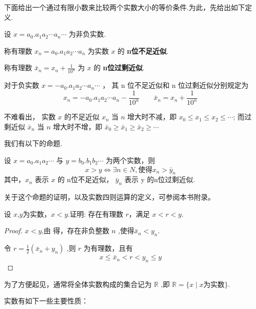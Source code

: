 下面给出一个通过有限小数来比较两个实数大小的等价条件.为此，先给出如下定义.

\begin{definition}[实数的近似]
    设 $x=a_0.a_1 a_2 \cdots a_n \cdots$ 为非负实数.

    \textbullet 称有理数 $x_n=a_0.a_1 a_2 \cdots a_n$ 为实数 $x$ 的 \textbf{n位不足近似}.

    \textbullet 称有理数 $\bar x_n=x_n + \frac{1}{10^n}$ 为 $x$ 的 \textbf{n位过剩近似}.

    对于负实数 $x=-a_0.a_1 a_2 \cdots a_n \cdots$ ， 其 n 位不足近似和 n 位过剩近似分别规定为
    \[
      x_n = -a_0.a_1 a_2 \cdots a_n - \frac{1}{10^n} \qquad \bar x_n = x_n +\frac{1}{10^n}
    \]
\end{definition}

\begin{annotation}
    不难看出， 实数 $x$ 的不足近似 $x_n$ 当 $n$ 增大时不减，即 $x_0 \le x_1 \le x_2 \le \cdots$; 而过剩近似 $\bar x_n $ 当 $n$ 增大时不增，即 $\bar x_0 \ge \bar x_1 \ge  \bar x_2 \ge \cdots$
\end{annotation}

我们有以下的命题.

\begin{proposition}[近似等价比大小]\label{pro:about}
    设 $x=a_0.a_1a_2\cdots$ 与 $y=b_0.b_1b_2\cdots$ 为两个实数，则
    \[
    x>y \iff \exists n\in N , \mbox{使得} x_n > \bar y_n
    \]
    其中，$x_n$ 表示 $x$ 的 n位不足近似， $\bar y_n$ 表示 y 的n位过剩近似.
\end{proposition}

关于这个命题的证明，以及实数四则运算的定义，可参阅本书附录。

\begin{example}[两个实数之间必定存在有理数]\label{ex:inside}
    设 $x$,$y$为实数，$x<y$.证明: 存在有理数 $r$，满足 $x<r<y$.
\end{example}

\begin{proof}
    $x<y$,由  得，存在非负整数 $n$ ,使得$\bar x_n < y_n$.

    令 $r=\frac{1}{2}(\bar x_n + y_n)$ ,则 $r$ 为有理数，且有
    \[
    x \le \bar x_n < r < y_n \le y
    \]
\end{proof}

为了方便起见，通常将全体实数构成的集合记为 $\mathbb{R}$ ,即 $\mathbb{R}=\{x\mid x\mbox{为实数}\}$.

实数有如下一些主要性质：

